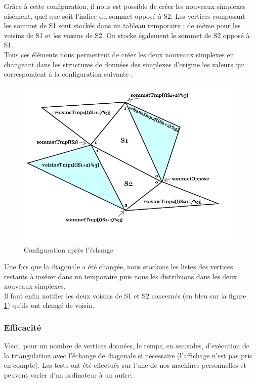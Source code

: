 \documentclass{article}
\begin{document}
	    Grâce à cette configuration, il nous est possible de créer les nouveaux simplexes aisément, quel que soit l'indice du sommet opposé à S2. Les vertices composant les sommet de S1 sont stockés dans un tableau temporaire ; de même pour les voisins de S1 et les voisins de S2. On stocke également le sommet de S2 opposé à S1.
	    \\Tous ces éléments nous permettent de créer les deux nouveaux simplexes en changeant dans les structures de données des simplexes d'origine les valeurs qui correspondent à la configuration suivante :
	    
	    \begin{figure}[H]
    		\centering
    		\includegraphics[scale=0.40]{config_apres_swap.jpg}     
    		\caption{Configuration après l'échange}
    		\label{fig3}
	    \end{figure}
	    
        Une fois que la diagonale a été changée, nous stockons les listes des vertices restants à insérer dans un temporaire puis nous les distribuons dans les deux nouveaux simplexes. 
        \\Il faut enfin notifier les deux voisins de S1 et S2 concernés (en bleu sur la figure \ref{fig3}) qu'ils ont changé de voisin.
        
        \subsubsection{Efficacité}
        
        Voici, pour un nombre de vertices données, le temps, en secondes, d'exécution de la triangulation avec l'échange de diagonale si nécessaire (l'affichage n'est pas pris en compte). Les tests ont été effectués sur l'une de nos machines personnelles et peuvent varier d'un ordinateur à un autre.
        
\end{document}
